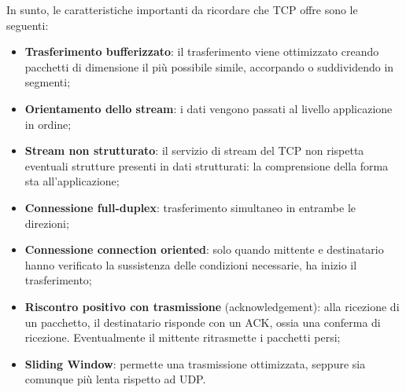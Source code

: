         In sunto, le caratteristiche importanti da ricordare che TCP offre sono le seguenti:
        \begin{itemize}
            \item \textbf{Trasferimento bufferizzato}: il trasferimento viene ottimizzato creando pacchetti di
            dimensione il più possibile simile, accorpando o suddividendo in segmenti;
            \item \textbf{Orientamento dello stream}: i dati vengono passati al livello applicazione in ordine;
            \item \textbf{Stream non strutturato}: il servizio di stream del TCP non rispetta eventuali strutture
            presenti in dati strutturati: la comprensione della forma sta all’applicazione;
            \item \textbf{Connessione full-duplex}: trasferimento simultaneo in entrambe le direzioni;
            \item \textbf{Connessione connection oriented}: solo quando mittente e destinatario hanno
            verificato la sussistenza delle condizioni necessarie, ha inizio il trasferimento;
            \item \textbf{Riscontro positivo con trasmissione} (acknowledgement): alla ricezione di un
            pacchetto, il destinatario risponde con un ACK, ossia una conferma di ricezione.
            Eventualmente il mittente ritrasmette i pacchetti persi;
            \item \textbf{Sliding Window}: permette una trasmissione ottimizzata, seppure sia comunque più
            lenta rispetto ad UDP.
        \end{itemize}